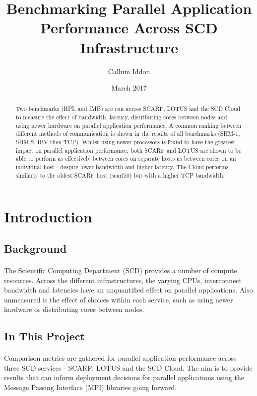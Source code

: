 \documentclass{article}
\title{Benchmarking Parallel Application Performance Across SCD Infrastructure}
\author{Callum Iddon }
\date{March 2017}
\begin{document}

\maketitle

\begin{abstract}
Two benchmarks (HPL and IMB) are run across SCARF, LOTUS and the SCD Cloud to measure the effect of bandwidth, latency, distributing cores between nodes and using newer hardware on parallel application performance. A common ranking between different methods of communication is shown in the results of all benchmarks (SHM-1, SHM-2, IBV then TCP). Whilst using newer processors is found to have the greatest impact on parallel application performance, both SCARF and LOTUS are shown to be able to perform as effectively between cores on separate hosts as between cores on an individual host - despite lower bandwidth and higher latency. The Cloud performs similarly to the oldest SCARF host (scarf10) but with a higher TCP bandwidth.
\end{abstract}


\tableofcontents

\section{Introduction}

    \subsection{Background}
        \paragraph{}
        The Scientific Computing Department (SCD) provides a number of compute resources. Across the different infrastructures, the varying CPUs, interconnect bandwidth and latencies have an unquantified effect on parallel applications. Also unmeasured is the effect of choices within each service, such as using newer hardware or distributing cores between nodes.

    \subsection{In This Project}
        \paragraph{}
        Comparison metrics are gathered for parallel application performance across three SCD services - SCARF, LOTUS and the SCD Cloud. The aim is to provide results that can inform deployment decisions for parallel applications using the Message Passing Interface (MPI) libraries going forward.
\end{document}
